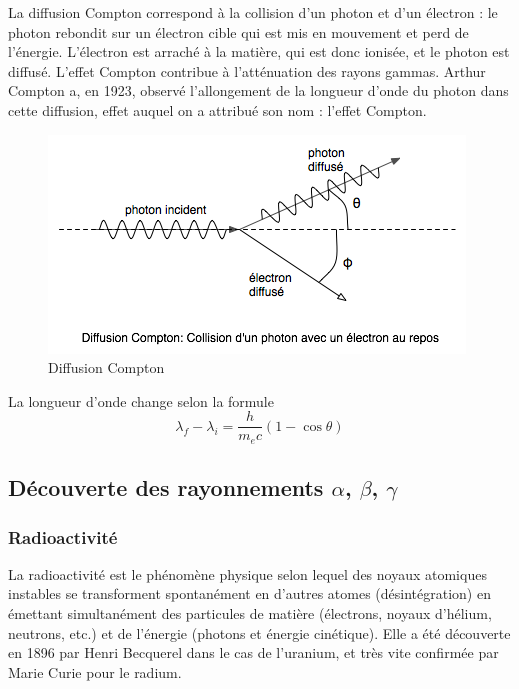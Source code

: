     La diffusion Compton correspond à la collision d’un photon et d’un électron : le photon rebondit sur un électron cible qui est mis en mouvement et perd de l’énergie. L'électron est arraché à la matière, qui est donc ionisée, et le photon est diffusé. L'effet Compton contribue à l'atténuation des rayons gammas.  Arthur Compton a, en 1923, observé l'allongement de la longueur d'onde du photon dans cette diffusion, effet auquel on a attribué son nom : l'effet Compton. 
    
    \begin{figure}[ht]
        \centering
        \includegraphics[scale=0.60]{Images1/compton.png}
        \caption{Diffusion Compton}
    \end{figure}
    
La longueur d'onde change selon la formule 
    \[
        \lambda_f-\lambda_i=\dfrac{h}{m_ec}(1-\cos{\theta})
    \]
    \subsection{Découverte des rayonnements $\alpha$, $\beta$, $\gamma$}

    \subsubsection{Radioactivité}

    La radioactivité est le phénomène physique selon lequel des noyaux atomiques instables se transforment spontanément en d'autres atomes (désintégration) en émettant simultanément des particules de matière (électrons, noyaux d'hélium, neutrons, etc.) et de l'énergie (photons et énergie cinétique). Elle a été découverte en 1896 par Henri Becquerel dans le cas de l'uranium, et très vite confirmée par Marie Curie pour le radium. 
    
    \vspace{0.5cm}

